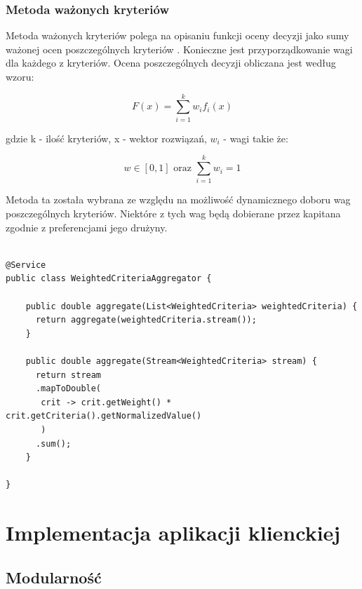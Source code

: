 \subsubsection{Metoda ważonych kryteriów}

Metoda ważonych kryteriów polega na opisaniu funkcji oceny decyzji jako sumy ważonej ocen poszczególnych kryteriów \cite{analizawielok}. Konieczne jest przyporządkowanie wagi dla każdego z kryteriów. Ocena poszczególnych decyzji obliczana jest według wzoru: 

\begin{equation}\label{eq:mwk}
F(x)=\sum_{i=1}^{k}w_{i}f_{i}(x)
\end{equation}

gdzie k - ilość kryteriów, x - wektor rozwiązań, $w_{i}$ - wagi takie że:

\begin{equation*}
w \in [0, 1] \mbox{ oraz } \sum_{i=1}^{k}w_{i} = 1
\end{equation*}

Metoda ta została wybrana ze względu na możliwość dynamicznego doboru wag poszczególnych kryteriów. Niektóre z tych wag będą dobierane przez kapitana zgodnie z preferencjami jego drużyny. 


\begin{minipage}{\linewidth}
\begin{lstlisting}[label=list:resource, caption=Przykładowa rejestracja kontrolera, basicstyle=\footnotesize\ttfamily]

@Service
public class WeightedCriteriaAggregator {

    public double aggregate(List<WeightedCriteria> weightedCriteria) {
      return aggregate(weightedCriteria.stream());
    }

    public double aggregate(Stream<WeightedCriteria> stream) {
      return stream
      .mapToDouble(
       crit -> crit.getWeight() * crit.getCriteria().getNormalizedValue()
       )
      .sum();
    }

}

\end{lstlisting}
\end{minipage}

\section{Implementacja aplikacji klienckiej}

\subsection{Modularność}

